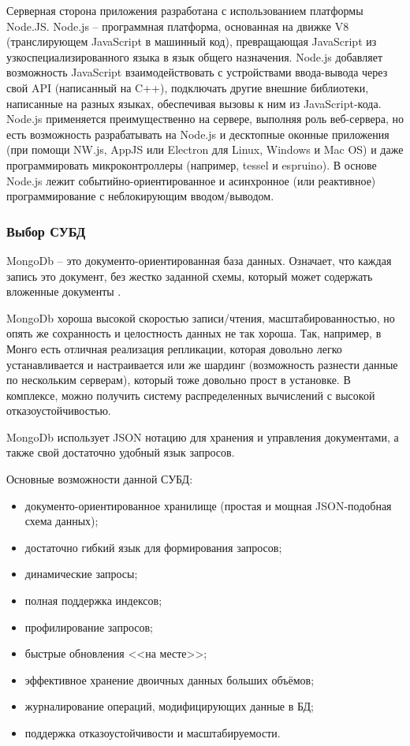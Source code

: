 Серверная сторона приложения разработана с использованием платформы Node.JS.
Node.js -- программная платформа, основанная на движке V8 (транслирующем JavaScript в машинный код), превращающая JavaScript из узкоспециализированного языка в язык общего назначения. Node.js добавляет возможность JavaScript взаимодействовать с устройствами ввода-вывода через свой API (написанный на C++), подключать другие внешние библиотеки, написанные на разных языках, обеспечивая вызовы к ним из JavaScript-кода. Node.js применяется преимущественно на сервере, выполняя роль веб-сервера, но есть возможность разрабатывать на Node.js и десктопные оконные приложения (при помощи NW.js, AppJS или Electron для Linux, Windows и Mac OS) и даже программировать микроконтроллеры (например, tessel и espruino). В основе Node.js лежит событийно-ориентированное и асинхронное (или реактивное) программирование с неблокирующим вводом/выводом.

\subsubsection{Выбор СУБД}

MongoDb -- это документо-ориентированная база данных. Означает, что каждая запись это документ, без жестко заданной схемы, который может содержать вложенные документы \cite{mongodb}.

MongoDb хороша высокой скоростью записи/чтения, масштабированностью, но опять же сохранность и целостность данных не так хороша. Так, например, в Монго есть отличная реализация репликации, которая довольно легко устанавливается и настраивается или же шардинг (возможность разнести данные по нескольким серверам), который тоже довольно прост в установке. В комплексе, можно получить систему распределенных вычислений с высокой отказоустойчивостью.

MongoDb использует JSON нотацию для хранения и управления документами, а также свой достаточно удобный язык запросов.

Основные возможности данной СУБД:
\begin{itemize}
  \item документо-ориентированное хранилище (простая и мощная JSON-подобная схема данных);
  \item достаточно гибкий язык для формирования запросов;
  \item динамические запросы;
  \item полная поддержка индексов;
  \item профилирование запросов;
  \item быстрые обновления <<на месте>>;
  \item эффективное хранение двоичных данных больших объёмов;
  \item журналирование операций, модифицирующих данные в БД;
  \item поддержка отказоустойчивости и масштабируемости.
\end{itemize}

